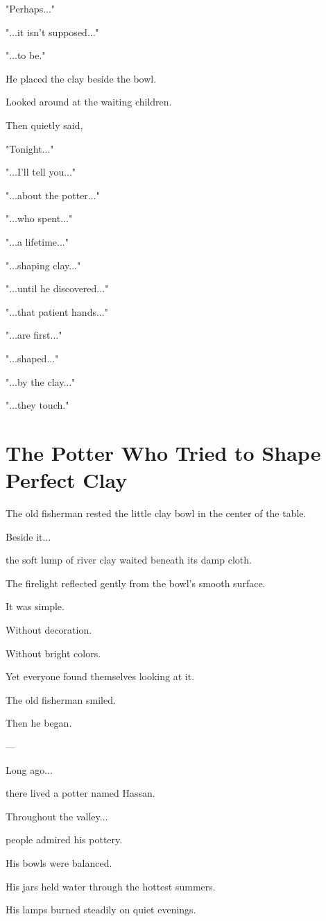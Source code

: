 \documentclass[12pt,openany]{book}
\begin{document}
"Perhaps..."

"...it isn't supposed..."

"...to be."

He placed the clay beside the bowl.

Looked around at the waiting children.

Then quietly said,

"Tonight..."

"...I'll tell you..."

"...about the potter..."

"...who spent..."

"...a lifetime..."

"...shaping clay..."

"...until he discovered..."

"...that patient hands..."

"...are first..."

"...shaped..."

"...by the clay..."

"...they touch."
\section*{The Potter Who Tried to Shape Perfect Clay}

The old fisherman rested the little clay bowl in the center of the table.

Beside it...

the soft lump of river clay waited beneath its damp cloth.

The firelight reflected gently from the bowl's smooth surface.

It was simple.

Without decoration.

Without bright colors.

Yet everyone found themselves looking at it.

The old fisherman smiled.

Then he began.

---

Long ago...

there lived a potter named Hassan.

Throughout the valley...

people admired his pottery.

His bowls were balanced.

His jars held water through the hottest summers.

His lamps burned steadily on quiet evenings.
\end{document}
